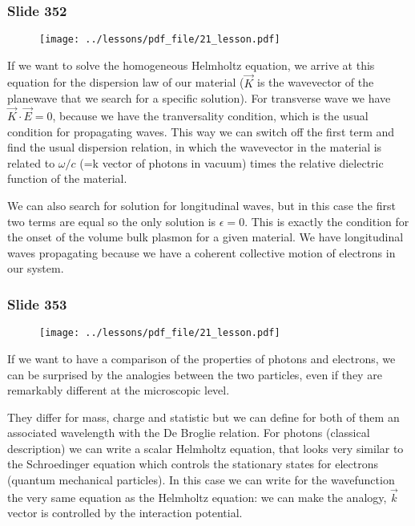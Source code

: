 \documentclass[../main/main.tex]{subfiles}
\begin{document}
\newpage

\subsubsection{Slide 352}

\begin{figure}[h!]
\centering
\texttt{[image: ../lessons/pdf\_file/21\_lesson.pdf]}
\end{figure}

If we want to solve the homogeneous Helmholtz equation, we arrive at this equation for the dispersion law of our material ($\vec{K}$ is the wavevector of the planewave that we search for a specific solution).
For transverse wave we have $\vec{K} \cdot \vec{E} =0$, because we have the tranversality condition, which is the usual condition for propagating waves. 
This way we can switch off the first term and find the usual dispersion relation, in which the wavevector in the material is related to $\omega /c$ (=k vector of photons in vacuum) times the relative dielectric function of the material.

We can also search for solution for longitudinal waves, but in this case the first two terms are equal so the only solution is $\epsilon=0$. This is exactly the condition for the onset of the volume bulk plasmon for a given material. We have longitudinal waves propagating because we have a coherent collective motion of electrons in our system.

\newpage

\subsubsection{Slide 353}

\begin{figure}[h!]
\centering
\texttt{[image: ../lessons/pdf\_file/21\_lesson.pdf]}
\end{figure}

If we want to have a comparison of the properties of photons and electrons, we can be surprised by the analogies between the two particles, even if they are remarkably different at the microscopic level.

They differ for mass, charge and statistic but we can define for both of them an associated wavelength with the De Broglie relation.
For photons (classical description) we can write a scalar Helmholtz equation, that looks very similar to the Schroedinger equation which controls the stationary states for electrons (quantum mechanical particles). In this case we can write for the wavefunction the very same equation as the Helmholtz equation: we can make the analogy, $\vec{k}$ vector is controlled by the interaction potential. 
\end{document}

